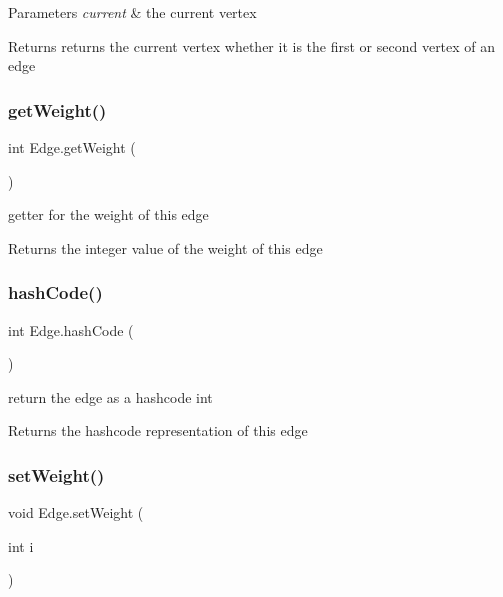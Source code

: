 \begin{DoxyParams}{Parameters}
{\em current} & the current vertex \\
\hline
\end{DoxyParams}
\begin{DoxyReturn}{Returns}
returns the current vertex whether it is the first or second vertex of an edge 
\end{DoxyReturn}
\mbox{\label{class_edge_a963d963b098f2329738cde01942be520}} 
\subsubsection{\texorpdfstring{get\+Weight()}{getWeight()}}
{\footnotesize\ttfamily int Edge.\+get\+Weight (\begin{DoxyParamCaption}{ }\end{DoxyParamCaption})}



getter for the weight of this edge 

\begin{DoxyReturn}{Returns}
the integer value of the weight of this edge 
\end{DoxyReturn}
\mbox{\label{class_edge_a3d641ff5fdd19b6ce360f591bd5bed54}} 
\subsubsection{\texorpdfstring{hash\+Code()}{hashCode()}}
{\footnotesize\ttfamily int Edge.\+hash\+Code (\begin{DoxyParamCaption}{ }\end{DoxyParamCaption})}



return the edge as a hashcode int 

\begin{DoxyReturn}{Returns}
the hashcode representation of this edge 
\end{DoxyReturn}
\mbox{\label{class_edge_acfaab81fcf6ebc68aaa268bf1f14cdea}} 
\subsubsection{\texorpdfstring{set\+Weight()}{setWeight()}}
{\footnotesize\ttfamily void Edge.\+set\+Weight (\begin{DoxyParamCaption}\item[{int}]{i }\end{DoxyParamCaption})}



